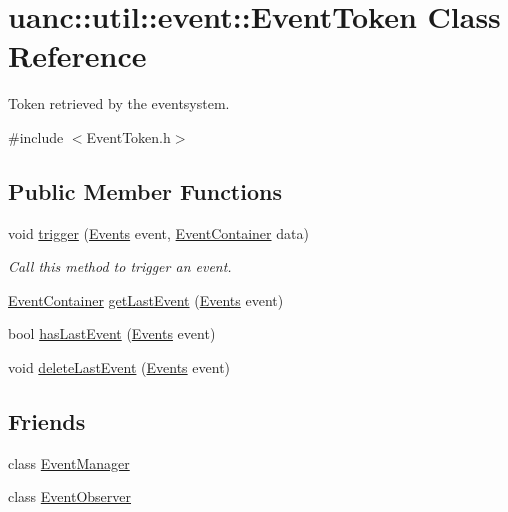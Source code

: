 \hypertarget{classuanc_1_1util_1_1event_1_1_event_token}{}\section{uanc\+:\+:util\+:\+:event\+:\+:Event\+Token Class Reference}
\label{classuanc_1_1util_1_1event_1_1_event_token}


Token retrieved by the eventsystem.  




{\ttfamily \#include $<$Event\+Token.\+h$>$}

\subsection*{Public Member Functions}
\begin{DoxyCompactItemize}
\item 
void \hyperlink{classuanc_1_1util_1_1event_1_1_event_token_a2bd43e6e227119b4b55a1a3adc7dd22c}{trigger} (\hyperlink{namespaceuanc_1_1util_1_1event_a63f690675589114db9c6bcbe6f1088a4}{Events} event, \hyperlink{classuanc_1_1util_1_1event_1_1_event_container}{Event\+Container} data)
\begin{DoxyCompactList}\small\item\em Call this method to trigger an event. \end{DoxyCompactList}\item 
\hyperlink{classuanc_1_1util_1_1event_1_1_event_container}{Event\+Container} \hyperlink{classuanc_1_1util_1_1event_1_1_event_token_ab2996160dd25090ef19681dcac70e302}{get\+Last\+Event} (\hyperlink{namespaceuanc_1_1util_1_1event_a63f690675589114db9c6bcbe6f1088a4}{Events} event)
\item 
bool \hyperlink{classuanc_1_1util_1_1event_1_1_event_token_ad0ee869b12bf8dfc3d7daa2aeb10d71f}{has\+Last\+Event} (\hyperlink{namespaceuanc_1_1util_1_1event_a63f690675589114db9c6bcbe6f1088a4}{Events} event)
\item 
void \hyperlink{classuanc_1_1util_1_1event_1_1_event_token_a8e7086a70365a2cd3d5e759fdae20b30}{delete\+Last\+Event} (\hyperlink{namespaceuanc_1_1util_1_1event_a63f690675589114db9c6bcbe6f1088a4}{Events} event)
\end{DoxyCompactItemize}
\subsection*{Friends}
\begin{DoxyCompactItemize}
\item 
class \hyperlink{classuanc_1_1util_1_1event_1_1_event_token_aba45a46c615e2683daffdae82e2d3b8f}{Event\+Manager}
\item 
class \hyperlink{classuanc_1_1util_1_1event_1_1_event_token_a7512992e19dc2f4613dea5e056e626f9}{Event\+Observer}
\end{DoxyCompactItemize}


